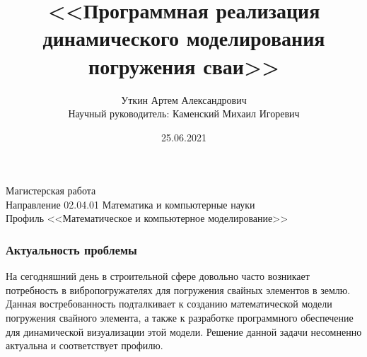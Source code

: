 \documentclass[10pt, pdf, hyperref={unicode}]{beamer}
\title{<<Программная реализация динамического моделирования погружения сваи>>}
\date{25.06.2021}
\author{Уткин Артем Александрович\\
    \vspace{0.7cm}
    Научный руководитель: Каменский Михаил Игоревич\\
    \vspace{0.7cm}
}
\begin{document}
    \begin{frame} %
        \titlepage
        \begin{center}
            Магистерская работа\\
            Направление 02.04.01 Математика и компьютерные науки\\
            Профиль <<Математическое и компьютерное моделирование>>\\
        \end{center}
    \end{frame}


    \begin{frame}
        \frametitle{Актуальность проблемы}
        \begin{center}
            \begin{minipage}[h]{0.97\linewidth}
                \begin{minipage}[h]{0.95\linewidth}
                    На сегодняшний день в строительной сфере довольно часто возникает потребность в вибропогружателях для погружения свайных элементов в землю.
                    \newline
                    Данная востребованность подталкивает к созданию математической модели погружения свайного элемента,
                    а также к разработке программного обеспечение для динамической визуализации этой модели.
                    \newline
                    Решение данной задачи несомненно актуальна и соответствует профилю.
                \end{minipage}
                \begin{minipage}[h]{0.22\linewidth}
                    \begin{figure}[h]
                        \centering

\end{figure}
\end{minipage}
\end{minipage}
\end{center}
\end{frame}
\end{document}
